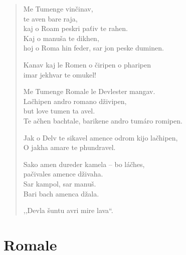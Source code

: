 \begin{verse}
Me Tumenge vinčinav, \\
te aven bare raja, \\
kaj o Roam peskri paťiv te rahen. \\
Kaj o manuša te dikhen, \\
hoj o Roma hin feder, sar jon peske duminen. 

\medskip

Kanav kaj le Romen o čiripen o pharipen \\
\hspace{\fill}imar jekhvar te omukel!

\medskip

Me Tumenge Romale le Devlester mangav. \\
Lačhipen andro romano dživipen, \\ 
\hspace{\fill}but love tumen ta  avel. \\
Te ačhen bachtale, barikene andro tumáro romipen. 

\medskip

Jak o Delv te sikavel amence odrom kijo lačhipen, \\ 
O jakha amare te phundravel.

\medskip

Sako amen dureder kamela -- bo láčhes, \\
\hspace{\fill}pačivales amence dživaha. \\
Sar kampol, sar manuš. \\
Bari bach amenca džala.

\medskip

,,Devla šuntu avri mire lava``.
\end{verse}


\section{Romale} 

